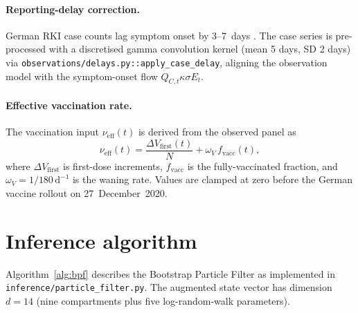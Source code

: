 \documentclass[11pt]{article}
\begin{document}
\paragraph{Reporting-delay correction.}
German RKI case counts lag symptom onset by 3--7~days \cite{abbott2020}.
The case series is pre-processed with a discretised gamma convolution kernel
(mean 5 days, SD 2 days) via \texttt{observations/delays.py::apply\_case\_delay},
aligning the observation model with the symptom-onset flow $Q_{C,t}\kappa\sigma E_t$.

\paragraph{Effective vaccination rate.}
The vaccination input $\nu_{\mathrm{eff}}(t)$ is derived from the
observed panel as
\[
  \nu_{\mathrm{eff}}(t) = \frac{\Delta V_{\mathrm{first}}(t)}{N}
  + \omega_V\,f_{\mathrm{vacc}}(t),
\]
where $\Delta V_{\mathrm{first}}$ is first-dose increments, $f_{\mathrm{vacc}}$
is the fully-vaccinated fraction, and $\omega_V=1/180\,\mathrm{d}^{-1}$
is the waning rate.  Values are clamped at zero before the German vaccine
rollout on 27~December~2020.


\section{Inference algorithm}
\label{sec:inference}

Algorithm~\ref{alg:bpf} describes the Bootstrap Particle Filter as
implemented in \texttt{inference/particle\_filter.py}.
The augmented state vector has dimension $d=14$
(nine compartments plus five log-random-walk parameters).
\end{document}
